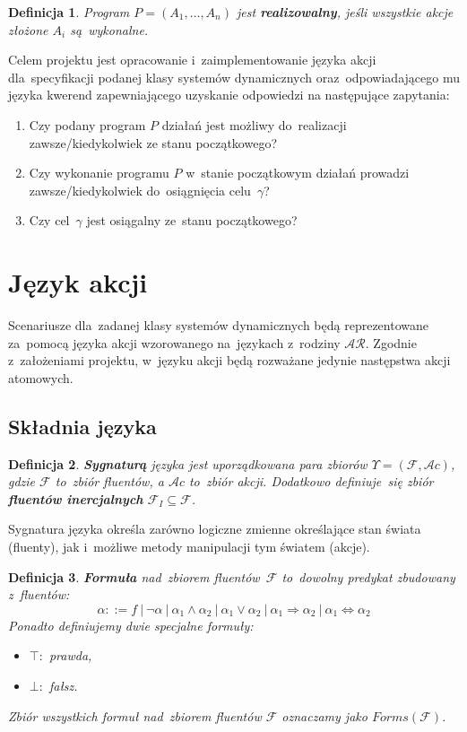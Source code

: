 \documentclass[11pt,a4paper]{article}
\newtheorem{defn}{Definicja}
\begin{document}
\begin{defn}
    Program $P = (A_1, \dots, A_n)$ jest \textbf{realizowalny}, jeśli wszystkie akcje złożone $A_i$ są~wykonalne.
\end{defn}

Celem projektu jest opracowanie i~zaimplementowanie języka akcji dla~specyfikacji podanej klasy systemów dynamicznych oraz~odpowiadającego mu języka kwerend zapewniającego uzyskanie odpowiedzi na następujące zapytania:

\begin{enumerate}
    \item Czy podany program $P$ działań jest możliwy do~realizacji zawsze/kiedykolwiek ze stanu początkowego?
    \item Czy wykonanie programu $P$ w~stanie początkowym działań prowadzi zawsze/kiedykolwiek do~osiągnięcia celu~$\gamma$?
    \item Czy cel~$\gamma$ jest osiągalny ze~stanu początkowego?
\end{enumerate}

\section{Język akcji}

Scenariusze dla~zadanej klasy systemów dynamicznych będą reprezentowane za~pomocą języka akcji wzorowanego na~językach z~rodziny $\mathcal{AR}$.
Zgodnie z~założeniami projektu, w~języku akcji będą rozważane jedynie następstwa akcji atomowych.

\subsection{Składnia języka}

\begin{defn}
    \textbf{Sygnaturą} języka jest uporządkowana para zbiorów $\Upsilon = (\mathcal{F}, \mathcal{A}c)$, gdzie $\mathcal{F}$ to~zbiór fluentów, a $ \mathcal{A}c$ to~zbiór akcji.
    Dodatkowo definiuje~się zbiór \textbf{fluentów inercjalnych} $\mathcal{F}_I \subseteq \mathcal{F}$.
\end{defn}

Sygnatura języka określa zarówno logiczne zmienne określające stan świata (fluenty), jak i~możliwe metody manipulacji tym światem (akcje).

\begin{defn}
    \textbf{Formuła} nad~zbiorem fluentów~$\mathcal{F}$ to~dowolny predykat zbudowany z~fluentów: 
    $$ \alpha ::= f\ |\ \neg\alpha\ |\ \alpha_1 \land \alpha_2\ |\ \alpha_1 \lor \alpha_2\ |\ \alpha_1 \Rightarrow \alpha_2\ |\ \alpha_1 \Leftrightarrow \alpha_2 $$
    Ponadto definiujemy dwie specjalne formuły:
    
    \begin{itemize}
    \item $\top\colon$ prawda,
    
    \item $\bot\colon$ fałsz.
    \end{itemize}
    
    Zbiór wszystkich formuł nad~zbiorem fluentów $\mathcal{F}$ oznaczamy jako $Forms(\mathcal{F})$.
\end{defn}
\end{document}

